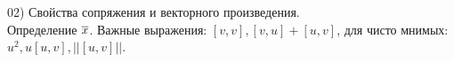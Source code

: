 02) Свойства сопряжения и векторного произведения.\\
Определение $\overline{x}$. Важные выражения: $[v, v], [v, u] + [u, v]$, для чисто мнимых: $u^2, u[u,v], ||[u, v]||$.\\
